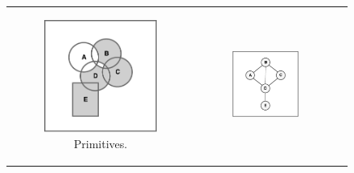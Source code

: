 \begin{figure}[htb]
	\centering
	\begin{tabular}[c]{ccc}
		\begin{subfigure}[c]{0.28\linewidth}
			\includegraphics[width=\textwidth]{figures/pipe_0.pdf}
			\caption{Primitives.}
			\label{fig:pipe0}
		\end{subfigure}&
		\begin{subfigure}[c]{0.28\linewidth}
			\includegraphics[width=\textwidth]{figures/pipe_1.pdf}

\end{subfigure}
\end{tabular}
\end{figure}
